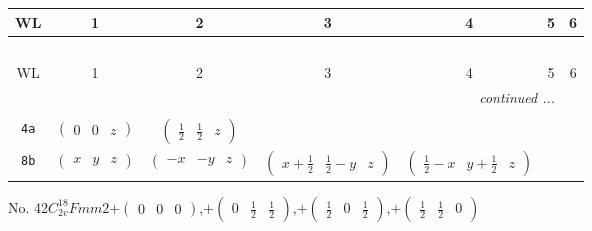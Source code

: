 \documentclass[fleqn,9pt,landscape]{jsarticle}
\begin{document}
\begin{center}
\renewcommand{\arraystretch}{1.2}
\begin{longtable}{ccccccc}
 \hline \hline
WL & 1 & 2 & 3 & 4 & 5 & 6 \\ \hline \endfirsthead

\multicolumn{6}{l}{\tablename\ \thetable{}} \\
 \hline \hline
WL & 1 & 2 & 3 & 4 & 5 & 6 \\ \hline \endhead

 \hline \hline
\multicolumn{6}{r}{\footnotesize\it continued ...} \\ \endfoot

 \hline \hline
\multicolumn{6}{r}{} \\ \endlastfoot

{\tt 4a} & $ \begin{pmatrix} 0 & 0 & z \end{pmatrix} $ & $ \begin{pmatrix} \frac{1}{2} & \frac{1}{2} & z \end{pmatrix} $ & $  $ & $  $ \\ \hline
{\tt 8b} & $ \begin{pmatrix} x & y & z \end{pmatrix} $ & $ \begin{pmatrix} - x & - y & z \end{pmatrix} $ & $ \begin{pmatrix} x + \frac{1}{2} & \frac{1}{2} - y & z \end{pmatrix} $ & $ \begin{pmatrix} \frac{1}{2} - x & y + \frac{1}{2} & z \end{pmatrix} $ \\
\end{longtable}
\end{center}
\newpage
No. 42\quad$C_{2v}^{18}$\quad$Fmm2$\quad[ orthorhombic ]\quad$+\begin{pmatrix} 0 & 0 & 0 \end{pmatrix}$,\quad $+\begin{pmatrix} 0 & \frac{1}{2} & \frac{1}{2} \end{pmatrix}$,\quad $+\begin{pmatrix} \frac{1}{2} & 0 & \frac{1}{2} \end{pmatrix}$,\quad $+\begin{pmatrix} \frac{1}{2} & \frac{1}{2} & 0 \end{pmatrix}$
\end{document}
